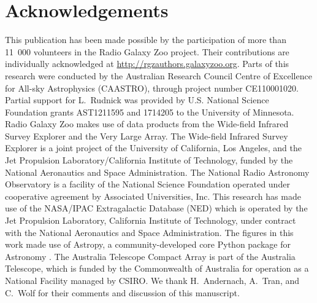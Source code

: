 \documentclass[fleqn,usenatbib,usedcolumn]{mnras}
\begin{document}
\section{Acknowledgements}

  This publication has been made possible by the participation of more than 11~000 volunteers in the Radio Galaxy Zoo project. Their contributions are individually acknowledged at \url{http://rgzauthors.galaxyzoo.org}. Parts of this research were conducted by the Australian Research Council Centre of Excellence for All-sky Astrophysics (CAASTRO), through project number CE110001020. Partial support for L.~Rudnick was provided by U.S. National Science Foundation grants AST1211595 and 1714205 to the University of Minnesota. Radio Galaxy Zoo makes use of data products from the Wide-field Infrared Survey Explorer and the Very Large Array. The Wide-field Infrared Survey Explorer is a joint project of the University of California, Los Angeles, and the Jet Propulsion Laboratory/California Institute of Technology, funded by the National Aeronautics and Space Administration. The National Radio Astronomy Observatory is a facility of the National Science Foundation operated under cooperative agreement by Associated Universities, Inc. This research has made use of the NASA/IPAC Extragalactic Database (NED) which is operated by the Jet Propulsion Laboratory, California Institute of Technology, under contract with the National Aeronautics and Space Administration. The figures in this work made use of Astropy, a community-developed core Python package for Astronomy \citep{astropy}. The Australia Telescope Compact Array is part of the Australia Telescope, which is funded by the Commonwealth of Australia for operation as a National Facility managed by CSIRO. We thank H.~Andernach, A.~Tran, and C.~Wolf for their comments and discussion of this manuscript.

%




\end{document}
